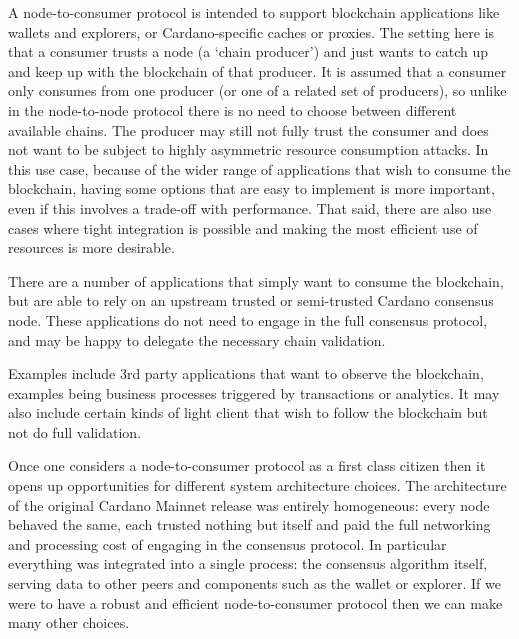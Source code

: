 \documentclass{report}
\theoremstyle{definition}{
  \newtheorem{lemma}{Lemma}[section] %
  \newtheorem{definition}[lemma]{Definition}
}
\theoremstyle{theorem}{
  \newtheorem{invariant}[lemma]{Invariant}
  \newtheorem{proofobligation}[lemma]{Proof Obligation}
}
\numberwithin{equation}{lemma}
\begin{document}
A node-to-consumer protocol is intended to support blockchain applications
like wallets and explorers, or Cardano-specific caches or proxies. The setting
here is that a consumer trusts a node (a `chain producer') and just wants to
catch up and keep up with the blockchain of that producer. It is assumed that
a consumer only consumes from one producer (or one of a related set of
producers), so unlike in the node-to-node protocol there is no need to choose
between different available chains. The producer may still not fully trust the
consumer and does not want to be subject to highly asymmetric resource
consumption attacks. In this use case, because of the wider range of
applications that wish to consume the blockchain, having some options that are
easy to implement is more important, even if this involves a trade-off with
performance. That said, there are also use cases where tight integration is
possible and making the most efficient use of resources is more desirable.

There are a number of applications that simply want to consume the blockchain,
but are able to rely on an upstream trusted or semi-trusted Cardano consensus
node. These applications do not need to engage in the full consensus protocol,
and may be happy to delegate the necessary chain validation.

Examples include 3rd party applications that want to observe the blockchain,
examples being business processes triggered by transactions or analytics.  It
may also include certain kinds of light client that wish to follow the
blockchain but not do full validation.

Once one considers a node-to-consumer protocol as a first class citizen then it
opens up opportunities for different system architecture choices.
The architecture of the original Cardano Mainnet release was entirely homogeneous:
every node behaved the same, each trusted nothing but itself and paid the full
networking and processing cost of engaging in the consensus protocol.  In
particular everything was integrated into a single process: the consensus
algorithm itself, serving data to other peers and components such as the wallet
or explorer. If we were to have a robust and efficient node-to-consumer protocol
then we can make many other choices.
\end{document}
